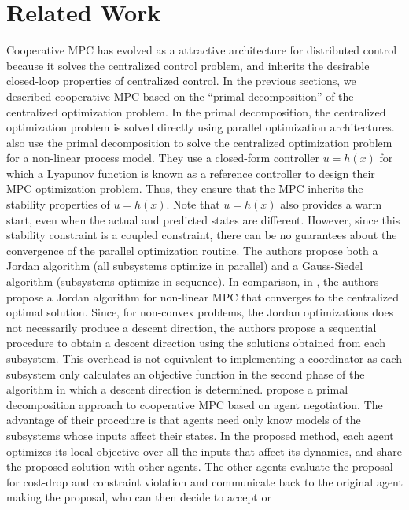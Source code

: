 \documentclass[10pt]{article}
\theoremstyle{definition}
\begin{document}
\section{Related Work}
\label{sec:related}
Cooperative MPC has evolved as a attractive architecture for
distributed control because it solves the centralized control
problem, and inherits the desirable closed-loop properties of
centralized control. 
In the previous sections, we described
cooperative MPC based on the ``primal decomposition'' of the
centralized optimization
problem. In the primal decomposition, the centralized optimization
problem is solved directly using parallel optimization
architectures. \citet{liu:chen:pena:christofides:2010} also use the
primal decomposition to solve the centralized optimization problem for a
non-linear process model. They use a closed-form controller $u=h(x)$
for which a Lyapunov function is known as a reference controller to
design their MPC optimization problem. Thus, they ensure that the MPC
inherits the stability properties of $u=h(x)$. Note that $u=h(x)$ also
provides a warm start, even when the actual and predicted states are
different. However, since this stability constraint is a coupled
constraint, there can be no guarantees about the convergence of the
parallel optimization routine. The authors propose both a Jordan
algorithm (all subsystems optimize in parallel) and a Gauss-Siedel
algorithm (subsystems optimize in sequence). In comparison, in
\citet{stewart:wright:rawlings:2011}, the authors propose a Jordan
algorithm for non-linear MPC that converges to the centralized optimal
solution. Since, for non-convex problems, the Jordan optimizations
does not necessarily produce a descent direction, the authors propose
a sequential procedure to obtain a descent direction using the
solutions obtained from each subsystem. This overhead is not
equivalent to implementing a coordinator as each subsystem only
calculates an objective function in the second phase of the algorithm
in which a descent direction is
determined. \citet{maestre:pena:camacho:alamo:2011} propose a primal
decomposition approach to cooperative MPC based on agent
negotiation. The advantage of their procedure is that agents need only
know models of the subsystems whose inputs affect their states. In the
proposed method, each agent optimizes its local objective over all
the inputs that affect its dynamics, and share the proposed solution
with other agents. The other agents evaluate the proposal for
cost-drop and constraint violation and communicate back to the
original agent making the proposal, who can then decide to accept or
\end{document}
